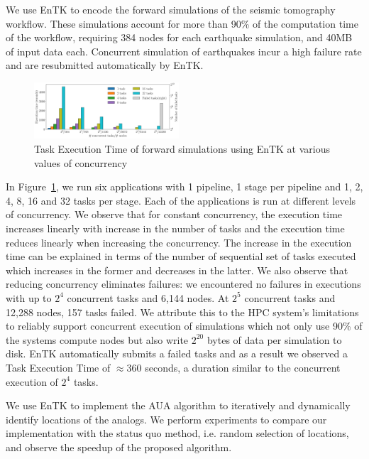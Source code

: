 We use EnTK to encode the forward simulations of the seismic tomography 
workflow. These simulations account for more than 90\% of the computation time 
of the workflow, requiring 384 nodes for each earthquake simulation, and 40MB
of input data each. Concurrent simulation of earthquakes incur a high failure 
rate and are resubmitted automatically by EnTK.

\begin{figure} 
\includegraphics[width=0.48\textwidth]{figs/specfem_exec_time_varying_concurrency_titan.pdf}
\caption{Task  Execution  Time  of  forward  simulations  using EnTK at various 
values of concurrency}\label{fig:specfem}
\end{figure}

In Figure~\ref{fig:specfem}, we run six applications with 1 pipeline, 1 stage 
per pipeline and 1, 2, 4, 8, 16 and 32 tasks per stage. Each of the applications
is run at different levels of concurrency. We observe that for constant
concurrency, the execution time increases linearly with increase in the number 
of tasks and the execution time reduces linearly when increasing the 
concurrency. The increase in the execution time can be explained in terms of the
number of sequential set of tasks executed which increases in the former and
decreases in the latter. We also observe that reducing concurrency eliminates 
failures: we encountered no failures in executions with up to $2^4$ concurrent 
tasks and 6,144 nodes. At $2^5$ concurrent tasks and 12,288 nodes, 157 tasks 
failed. We attribute this to the HPC system's limitations to reliably support 
concurrent execution of simulations which not only use 90\% of the systems 
compute nodes but also write $2^{20}$ bytes of data per simulation to disk. 
EnTK automatically submits a failed tasks and as a result we observed a Task 
Execution Time of \(\approx\)360 seconds, a duration similar to the concurrent
execution of $2^4$ tasks.


We use EnTK to implement the AUA algorithm to iteratively and dynamically 
identify locations of the analogs. We perform experiments to compare our 
implementation with the status quo method, i.e. random selection of locations, 
and observe the speedup of the proposed algorithm.

